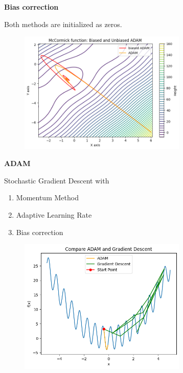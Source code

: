 \documentclass{beamer}
\newcommand\myheading[1]{%
  \par\bigskip
  {\Large\bfseries#1}\par\smallskip}
\begin{document}
\begin{frame}
    \myheading{Bias correction}
    Both methods are initialized as zeros.
    
    \begin{figure}[h]
        \includegraphics[width=8cm]{report/figures/ADAM_bias.png}
    \end{figure}
\end{frame}



\begin{frame}
    \myheading{ADAM}
    Stochastic Gradient Descent with
    \begin{enumerate}
        \item Momentum Method
        \item Adaptive Learning Rate
        \item Bias correction
    \end{enumerate}
    
    \begin{figure}[h]
        \includegraphics[width=8cm]{report/figures/adam_vs_gradientdescent.png}
    \end{figure}
\end{frame}
\end{document}
